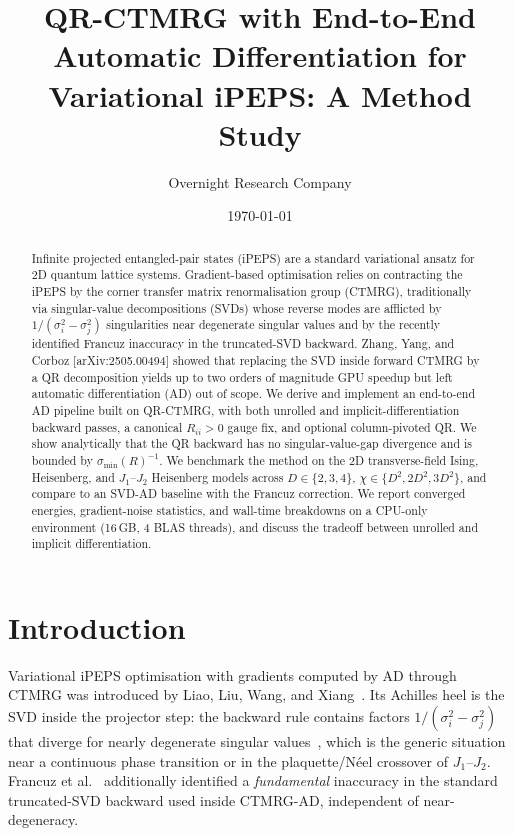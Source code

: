 \documentclass[aps,prb,reprint,amsmath,amssymb,superscriptaddress,floatfix]{revtex4-2}
\begin{document}
\title{QR-CTMRG with End-to-End Automatic Differentiation for Variational iPEPS: A Method Study}

\author{Overnight Research Company}

\date{\today}

\begin{abstract}
Infinite projected entangled-pair states (iPEPS) are a standard variational
ansatz for 2D quantum lattice systems. Gradient-based optimisation relies on
contracting the iPEPS by the corner transfer matrix renormalisation group
(CTMRG), traditionally via singular-value decompositions (SVDs) whose reverse
modes are afflicted by $1/(\sigma_i^2-\sigma_j^2)$ singularities near degenerate
singular values and by the recently identified Francuz inaccuracy in the
truncated-SVD backward. Zhang, Yang, and Corboz [arXiv:2505.00494] showed that
replacing the SVD inside forward CTMRG by a QR decomposition yields up to
two orders of magnitude GPU speedup but left automatic differentiation (AD)
out of scope. We derive and implement an end-to-end AD pipeline built on
QR-CTMRG, with both unrolled and implicit-differentiation backward passes,
a canonical $R_{ii}>0$ gauge fix, and optional column-pivoted QR. We show
analytically that the QR backward has no singular-value-gap divergence and
is bounded by $\sigma_{\min}(R)^{-1}$. We benchmark the method on the 2D
transverse-field Ising, Heisenberg, and $J_1$--$J_2$ Heisenberg models across
$D\in\{2,3,4\}$, $\chi\in\{D^2,2D^2,3D^2\}$, and compare to an SVD-AD
baseline with the Francuz correction. We report converged energies,
gradient-noise statistics, and wall-time breakdowns on a CPU-only
environment (16\,GB, 4 BLAS threads), and discuss the tradeoff between
unrolled and implicit differentiation.
\end{abstract}

\maketitle

\section{Introduction}
\label{sec:intro}

Variational iPEPS optimisation with gradients computed by AD through CTMRG
was introduced by Liao, Liu, Wang, and Xiang~\cite{Liao2019}. Its
Achilles heel is the SVD inside the projector step: the backward rule
contains factors $1/(\sigma_i^2-\sigma_j^2)$ that diverge for nearly
degenerate singular values~\cite{Townsend2018,Hauschild2018}, which is the
generic situation near a continuous phase transition or in the
plaquette/N\'eel crossover of $J_1$--$J_2$. Francuz et
al.~\cite{FrancuzPRR2025} additionally identified a \emph{fundamental}
inaccuracy in the standard truncated-SVD backward used inside CTMRG-AD,
independent of near-degeneracy.
\end{document}
